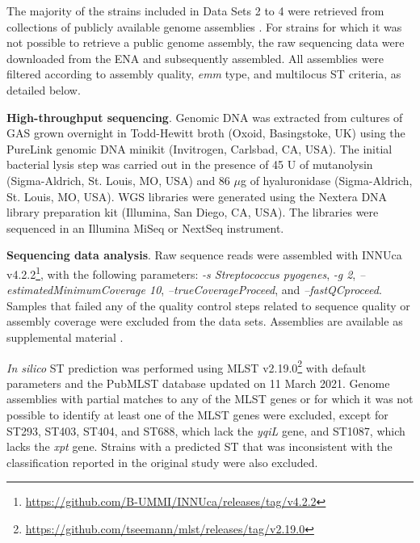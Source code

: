 The majority of the strains included in Data Sets 2 to 4 \cite{friaes_supplemental_2023} were retrieved from collections of publicly available genome assemblies \cite{blackwell_exploring_2021, oleary_reference_2016}. For strains for which it was not possible to retrieve a public genome assembly, the raw sequencing data were downloaded from the \ac{ENA} and subsequently assembled. All assemblies were filtered according to assembly quality, \textit{emm} type, and multilocus \ac{ST} criteria, as detailed below.

\textbf{High-throughput sequencing}. Genomic DNA was extracted from cultures of \ac{GAS} grown overnight in Todd-Hewitt broth (Oxoid, Basingstoke, UK) using the PureLink genomic DNA minikit (Invitrogen, Carlsbad, CA, USA). The initial bacterial lysis step was carried out in the presence of 45 U of mutanolysin (Sigma-Aldrich, St. Louis, MO, USA) and 86 $\mu$g of hyaluronidase (Sigma-Aldrich, St. Louis, MO, USA). \ac{WGS} libraries were generated using the Nextera DNA library preparation kit (Illumina, San Diego, CA, USA). The libraries were sequenced in an Illumina MiSeq or NextSeq instrument.

\textbf{Sequencing data analysis}. Raw sequence reads were assembled with INNUca v4.2.2\footnote{\url{https://github.com/B-UMMI/INNUca/releases/tag/v4.2.2}}, with the following parameters: \textit{-s Streptococcus pyogenes}, \textit{-g 2}, \textit{–estimatedMinimumCoverage 10}, \textit{–trueCoverageProceed}, and \textit{–fastQCproceed}. Samples that failed any of the quality control steps related to sequence quality or assembly coverage were excluded from the data sets. Assemblies are available as supplemental material \cite{friaes_supplemental_2023}.

\textit{In silico} \ac{ST} prediction was performed using MLST v2.19.0\footnote{\url{https://github.com/tseemann/mlst/releases/tag/v2.19.0}} with default parameters and the PubMLST database updated on 11 March 2021. Genome assemblies with partial matches to any of the \ac{MLST} genes or for which it was not possible to identify at least one of the \ac{MLST} genes were excluded, except for ST293, ST403, ST404, and ST688, which lack the \textit{yqiL} gene, and ST1087, which lacks the \textit{xpt} gene. Strains with a predicted \ac{ST} that was inconsistent with the classification reported in the original study were also excluded.

